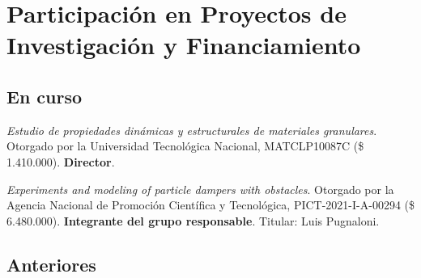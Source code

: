 \section{Participación en Proyectos de Investigación y Financiamiento}
\subsection{En curso}

\begin{timeline}
 \textit{Estudio de propiedades dinámicas y estructurales de materiales granulares}. Otorgado por la Universidad Tecnológica Nacional, MATCLP10087C (\$ 1.410.000). \textbf{Director}.


 \textit{Experiments and modeling of particle dampers with obstacles}. Otorgado por la Agencia Nacional de Promoción Científica y Tecnológica, PICT-2021-I-A-00294 (\$ 6.480.000). \textbf{Integrante del grupo responsable}. Titular: Luis Pugnaloni.
\end{timeline}

\subsection{Anteriores}

